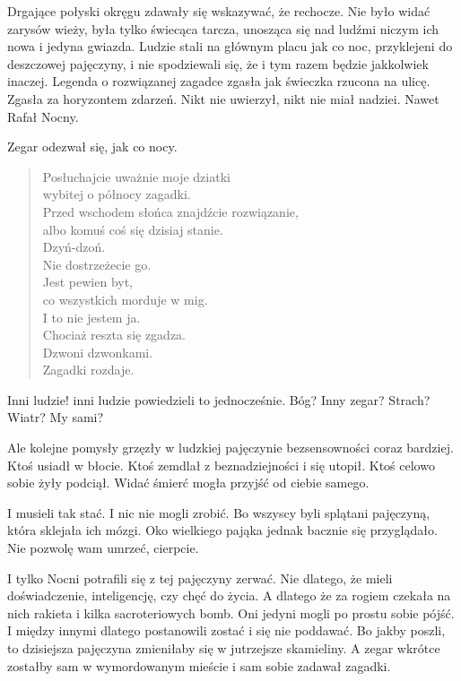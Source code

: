 Drgające połyski okręgu zdawały się wskazywać, że rechocze.
Nie było widać zarysów wieży, była tylko świecąca tarcza, unosząca się nad ludźmi niczym ich nowa i jedyna gwiazda.
Ludzie stali na głównym placu jak co noc, przyklejeni do deszczowej pajęczyny, i nie spodziewali się, że i tym razem będzie jakkolwiek inaczej.
Legenda o rozwiązanej zagadce zgasła jak świeczka rzucona na ulicę. Zgasła za horyzontem zdarzeń.
Nikt nie uwierzył, nikt nie miał nadziei.
Nawet Rafał Nocny.

Zegar odezwał się, jak co nocy.

\begin{sl}
\begin{quote}
Posłuchajcie uważnie moje dziatki \\
wybitej o północy zagadki. \\
Przed wschodem słońca znajdźcie rozwiązanie, \\
albo komuś coś się dzisiaj stanie. \\
Dzyń-dzoń. \\
Nie dostrzeżecie go. \\
Jest pewien byt, \\
co wszystkich morduje w mig. \\
I to nie jestem ja. \\
Chociaż reszta się zgadza. \\
Dzwoni dzwonkami. \\
Zagadki rozdaje. \\
\end{quote}
\end{sl}

\begin{dialogue}
	\ds{} Inni ludzie! \dm{} inni ludzie powiedzieli to jednocześnie.
	\ds{} Bóg?
	\ds{} Inny zegar?
	\ds{} Strach?
	\ds{} Wiatr?
	\ds{} My sami?
\end{dialogue}
Ale kolejne pomysły grzęzły w ludzkiej pajęczynie bezsensowności coraz bardziej.
Ktoś usiadł w błocie.
Ktoś zemdlał z beznadziejności i się utopił.
Ktoś celowo sobie żyły podciął.
Widać śmierć mogła przyjść od ciebie samego.

I musieli tak stać.
I nic nie mogli zrobić.
Bo wszyscy byli splątani pajęczyną, która sklejała ich mózgi.
Oko wielkiego pająka jednak bacznie się przyglądało.
Nie pozwolę wam umrzeć, cierpcie.

I tylko Nocni potrafili się z tej pajęczyny zerwać.
Nie dlatego, że mieli doświadczenie, inteligencję, czy chęć do życia.
A dlatego że za rogiem czekała na nich rakieta i kilka sacroteriowych bomb.
Oni jedyni mogli po prostu sobie pójść.
I między innymi dlatego postanowili zostać i się nie poddawać.
Bo jakby poszli, to dzisiejsza pajęczyna zmieniłaby się w jutrzejsze skamieliny.
A zegar wkrótce zostałby sam w wymordowanym mieście i sam sobie zadawał zagadki.

